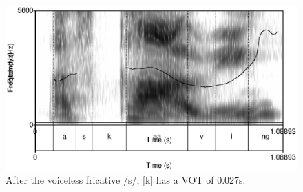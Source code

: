 \begin{figure}
 \centering
 \includegraphics[height=0.3\textheight]{./pics/askaaving.eps}

 \caption[VOT of /k/ after /s/]{After the voiceless fricative /s/, [k] has a VOT of 0.027s.}
 \label{fig:phon:vot:askaaving}
\end{figure}

% 

